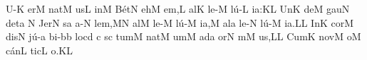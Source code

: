 \Internote
\nosolesmescustos
\initiumgregorianum
{}%
\sgn {}U-\punctum K\egn
\sgn {}er\punctum M\egn
\spatium
\sgn n{a}t\punctum M\egn
\sgn {}us\punctum L\egn
\spatium
\sgn {}in\punctum M\egn
\spatium
\sgn B{\'e}t\punctum N\egn
{}eh\punctum M\egn
\sgn {}e{m,}\punctum L\egn
\spatium
\sgn {}al\punctum K\egn
\sgn le-\punctum M\egn
\sgn l{\'u}-\punctum L\egn
\sgn ia:\punctum K\augmentum L\egn
\spatium
\divisiominor
\spatium
\sgn {}Un\punctum K\egn
\sgn de{}\punctum M\egn
\spatium
\sgn g{a}u\punctum N\egn
\sgn det\punctum a\egn
\spatium
\custos N
\lineaproxima
\sgn Jer\punctum N\egn
{}s\punctum a\egn
\sgn {}a-\punctum N\egn
\sgn le{m,}\punctum M\augmentum N\egn
\spatium
\divisiominor
\spatium
\sgn {}al\punctum M\egn
\sgn le-\punctum M\egn
\sgn l{\'u}-\punctum M\egn
\sgn ia,\punctum M\egn
\spatium
\sgn {}al\punctum a\egn
\sgn le-\punctum N\egn
\sgn l{\'u}-\punctum M\egn
\sgn ia.\punctum L\augmentum L\egn
\spatium
\divisiofinalis
\spatium
{}In\punctum K\egn
\spatium
\sgn c{o}r\punctum M\egn
\sgn dis\punctum N\egn
\spatium
\sgn j{\'u}-\punctum a\egn
\sgn bi-\bmolle b\punctum b\egn
\sgn lo{}\punctum c\augmentum d\egn
\spatium
\divisiominima
\spatium
\custos c
\lineaproxima
{}s\punctum c\egn
\sgn tum\punctum M\egn
\spatium
\sgn n{a}t\punctum M\egn
\sgn {}um\punctum M\egn
\spatium
\sgn {}ad\punctum a\egn
\sgn {}or\punctum N\egn
{}m\punctum M\egn
\sgn {}u{s,}\punctum L\augmentum L\egn
\spatium
\divisiominor
\spatium
\sgn Cum\punctum K\egn
\spatium
\sgn n{o}v\punctum M\egn
\sgn {}o{}\punctum M\egn
\spatium
\sgn c{\'a}n\punctum L\egn
\sgn tic\punctum L\egn
\sgn {}o.\punctum K\augmentum L\egn
\spatium
\Finisgregoriana

\bigskip

\beginlyrics

